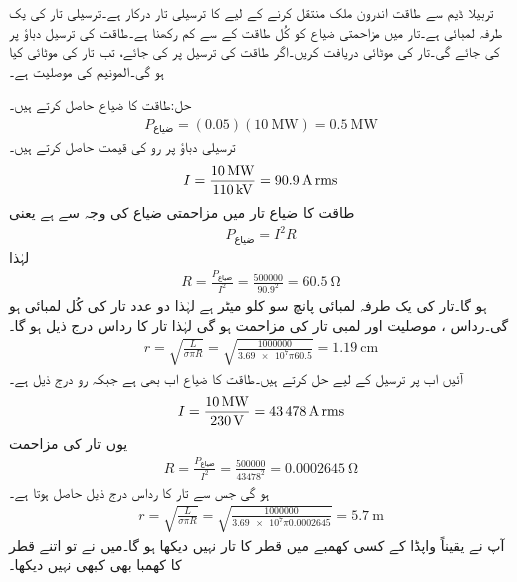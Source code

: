 تربیلا ڈیم سے  طاقت اندرون ملک منتقل کرنے کے لیے  کا ترسیلی تار درکار ہے۔ترسیلی تار کی یک طرفہ لمبائی  ہے۔تار میں مزاحمتی ضیاع کو کُل طاقت کے  سے کم رکھنا ہے۔طاقت کی ترسیل  دباؤ پر کی جائے گی۔تار کی موٹائی دریافت کریں۔اگر طاقت کی ترسیل  پر کی جائے، تب تار کی موٹائی کیا ہو گی۔المونیم کی موصلیت  ہے۔

حل:طاقت کا ضیاع حاصل کرتے ہیں۔
\begin{align*}
P_{\text{ضیاع}}=(0.05)(\SI{10}{\mega\watt})=\SI{0.5}{\mega\watt}
\end{align*}
ترسیلی دباؤ پر رو کی قیمت حاصل کرتے ہیں۔
\begin{align*}
I=\frac{\SI{10}{\mega\watt}}{\SI{110}{\kilo\volt}}=\SI{90.9}{\ampere}\,{\textup{rms}}
\end{align*}
طاقت کا ضیاع تار میں مزاحمتی ضیاع کی وجہ سے ہے یعنی
\begin{align*}
P_{\text{ضیاع}}=I^2 R
\end{align*}
لہٰذا
\begin{align*}
R=\frac{P_{\text{ضیاع}}}{I^2}=\frac{\num{500000}}{90.9^2}=\SI{60.5}{\ohm}
\end{align*}
ہو گا۔تار کی یک طرفہ لمبائی پانچ سو کلو میٹر ہے لہٰذا دو عدد تار کی کُل لمبائی  ہو گی۔رداس ، موصلیت  اور  لمبی تار کی مزاحمت  ہو گی لہٰذا تار کا رداس درج ذیل ہو گا۔
\begin{align*}
r=\sqrt{\frac{L}{\sigma \pi R}}=\sqrt{\frac{\num{1000000}}{\num{3.69e7} \pi 60.5}}=\SI{1.19}{\centi\meter}
\end{align*}
آئیں اب  پر ترسیل کے لیے حل کرتے ہیں۔طاقت کا ضیاع اب بھی   ہے جبکہ رو درج ذیل ہے۔
\begin{align*}
I=\frac{\SI{10}{\mega\watt}}{\SI{230}{\volt}}=\SI{43478}{\ampere}\,{\textup{rms}}
\end{align*}
یوں تار کی مزاحمت
\begin{align*}
R=\frac{P_{\text{ضیاع}}}{I^2}=\frac{\num{500000}}{43478^2}=\SI{0.0002645}{\ohm}
\end{align*}
ہو گی جس سے تار کا رداس درج ذیل حاصل ہوتا ہے۔
\begin{align*}
r=\sqrt{\frac{L}{\sigma \pi R}}=\sqrt{\frac{\num{1000000}}{\num{3.69e7} \pi 0.0002645}}=\SI{5.7}{\meter}
\end{align*}
آپ نے یقیناً واپڈا کے کسی کھمبے میں  قطر کا تار نہیں دیکھا ہو گا۔میں نے تو اتنے قطر کا کھمبا بھی کبھی نہیں دیکھا۔

